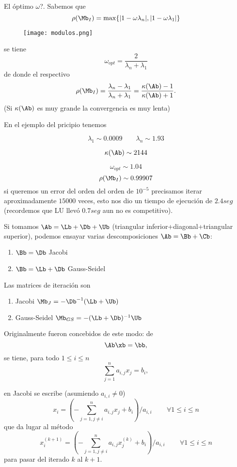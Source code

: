 El óptimo $\omega$?. Sabemos que
$$
\rho(\Mb_I)=\max\{
|1-\omega   \lambda_n|,|1-\omega   \lambda_1|\}
$$
\begin{figure}[h]
\centering\texttt{[image: modulos.png]}
\end{figure}

se tiene
$$
\omega_{opt}=\frac{2}{\lambda_n+\lambda_1}
$$
de donde el respectivo
$$\rho(\Mb_I)=\frac{\lambda_n-\lambda_1}{\lambda_n+\lambda_1}=\frac{\kappa(\Ab)-1}{\kappa(\Ab)+1}.
$$
(Si $\kappa(\Ab)$ es muy grande la convergencia es muy lenta)

En el ejemplo del pricipio tenemos

$$
\lambda_1\sim 0.0009 \qquad \lambda_n \sim 1.93
$$

$$\kappa(\Ab)\sim 2144$$

$$\omega_{opt}\sim
1.04$$
$$\rho(\Mb_I)\sim 0.99907$$
si queremos un error del orden del orden de $10^{-5}$ precisamos iterar aproximadamente $15000$ veces, esto nos dio un tiempo de ejecución de $2.4 seg$ (recordemos que LU llevó $0.7 seg$ aun no es competitivo).




\begin{center}
 { }
\end{center}


Si tomamos $\Ab=\Lb+\Db+\Ub$ (triangular inferior+diagonal+triangular superior), podemos ensayar varias descomposiciones $\Ab=\Bb+\Cb$:
\begin{enumerate}
 \item $\Bb=\Db$ Jacobi
 \item $\Bb=\Lb+\Db$ Gauss-Seidel
\end{enumerate}

Las matrices de iteración son
\begin{enumerate}
 \item Jacobi $\Mb_J=-\Db^{-1}(\Lb+\Ub)$
 \item Gauss-Seidel $\Mb_{GS}=-(\Lb+\Db)^{-1}\Ub$
\end{enumerate}

Originalmente fueron concebidos de este modo:
de
$$
\Ab\xb=\bb,
$$
se tiene, para todo $1\le i\le n$
$$
\sum_{j=1}^na_{i,j}x_j=b_i,
$$

en Jacobi se escribe (asumiendo $a_{i,i}\neq0$)
$$
x_i=\left(-\sum_{j=1,j\neq i}^na_{i,j}x_j+b_i\right)/a_{i,i}\, \qquad \forall 1\le i\le n
$$
que da lugar al método
$$
x_i^{(k+1)}=\left(-\sum_{j=1,j\neq i}^na_{i,j}x_j^{(k)}+b_i\right)/a_{i,i}\, \qquad \forall 1\le i\le n
$$
para pasar del iterado $k$ al $k+1$.




